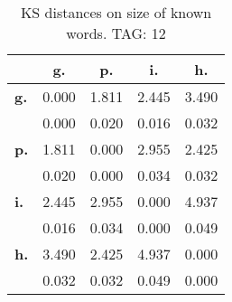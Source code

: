 \begin{table}[h!]
\begin{center}
\begin{tabular}{| l || c | c | c | c |}\hline
 & {\bf g.} & {\bf p.} & {\bf i.} & {\bf h.} \\\hline\hline
{\bf g.} & 0.000 & 1.811 & 2.445 & 3.490 \\
{\bf } & 0.000 & 0.020 & 0.016 & 0.032 \\\hline
{\bf p.} & 1.811 & 0.000 & 2.955 & 2.425 \\
{\bf } & 0.020 & 0.000 & 0.034 & 0.032 \\\hline
{\bf i.} & 2.445 & 2.955 & 0.000 & 4.937 \\
{\bf } & 0.016 & 0.034 & 0.000 & 0.049 \\\hline
{\bf h.} & 3.490 & 2.425 & 4.937 & 0.000 \\
{\bf } & 0.032 & 0.032 & 0.049 & 0.000 \\\hline
\end{tabular}
\caption{KS distances on size of known words. TAG: 12}
\end{center}
\end{table}